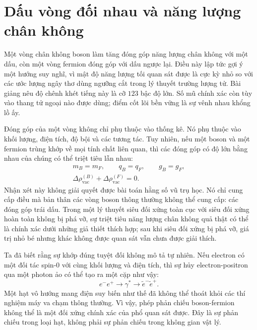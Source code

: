 \section{Dấu vòng đối nhau và năng lượng chân không}

Một vòng chân không boson làm tăng đóng góp năng lượng chân không với một dấu, còn một vòng fermion đóng góp với dấu ngược lại. Điều này lập tức gợi ý một hướng suy nghĩ, vì mật độ năng lượng tối quan sát được là cực kỳ nhỏ so với các ước lượng ngây thơ dùng ngưỡng cắt trong lý thuyết trường lượng tử. Bài giảng nêu độ chênh khét tiếng này là cỡ \(123\) bậc độ lớn. Số mũ chính xác còn tùy vào thang tử ngoại nào được dùng; điểm cốt lõi bền vững là sự vênh nhau khổng lồ ấy.

Đóng góp của một vòng không chỉ phụ thuộc vào thống kê. Nó phụ thuộc vào khối lượng, điện tích, độ bội và các tương tác. Tuy nhiên, nếu một boson và một fermion trùng khớp về mọi tính chất liên quan, thì các đóng góp có độ lớn bằng nhau của chúng có thể triệt tiêu lẫn nhau:
\begin{equation}
\begin{gathered}
m_B=m_F,\qquad q_B=q_F,\qquad g_B=g_F,\\
\Delta\rho_{\mathrm{vac}}^{(B)}
+\Delta\rho_{\mathrm{vac}}^{(F)}=0.
\end{gathered}
\end{equation}
Nhận xét này không giải quyết được bài toán hằng số vũ trụ học. Nó chỉ cung cấp điều mà bản thân các vòng boson thông thường không thể cung cấp: các đóng góp trái dấu. Trong một lý thuyết siêu đối xứng toàn cục với siêu đối xứng hoàn toàn không bị phá vỡ, sự triệt tiêu năng lượng chân không quả thật có thể là chính xác dưới những giả thiết thích hợp; sau khi siêu đối xứng bị phá vỡ, giá trị nhỏ bé nhưng khác không được quan sát vẫn chưa được giải thích.

Ta đã biết rằng sự khớp đúng tuyệt đối không mô tả tự nhiên. Nếu electron có một đối tác spin-0 với cùng khối lượng và điện tích, thì sự hủy electron-positron qua một photon ảo có thể tạo ra một cặp như vậy:
\begin{equation}
e^-e^+\longrightarrow\gamma^*
\longrightarrow\widetilde e^-\widetilde e^+.
\end{equation}
Một hạt vô hướng mang điện suy biến như thế đã không thể thoát khỏi các thí nghiệm máy va chạm thông thường. Vì vậy, phép phản chiếu boson-fermion không thể là một đối xứng chính xác của phổ quan sát được. Đây là sự phản chiếu trong loại hạt, không phải sự phản chiếu trong không gian vật lý.

